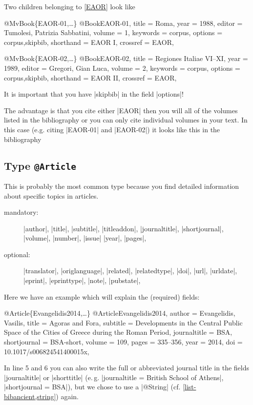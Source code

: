 \documentclass[a4paper,
10pt,
greek,
french,
spanish,
italian,
ngerman,
english
]{ltxdoc}
\begin{document}
Two children belonging to \cref{EAOR} look like

\begin{bibexample}[label=EAOR-01]{{@}MvBook\{EAOR-01,…\}}
@Book{EAOR-01,
  title     = {Roma},
  year      = {1988},
  editor    = {Tumolesi, Patrizia Sabbatini},
  volume    = {1},
  keywords  = {corpus},
  options   = {corpus,skipbib},
  shorthand = {EAOR I},
  crossref = {EAOR},
}
\end{bibexample}

\begin{bibexample}[label=EAOR-02]{{@}MvBook\{EAOR-02,…\}}
@Book{EAOR-02,
  title     = {Regiones Italiae VI--XI},
  year      = {1989},
  editor    = {Gregori, Gian Luca},
  volume    = {2},
  keywords  = {corpus},
  options   = {corpus,skipbib},
  shorthand = {EAOR II},
  crossref = {EAOR},
}
\end{bibexample}
It is important that you have |skipbib| in the field |options|!

The advantage is that you cite either |EAOR| then you will all of the volumes listed in the bibliography 
or you can only cite individual volumes in your text.
In this case (e.g. citing |EAOR-01| and |EAOR-02|) it looks like this in the bibliography 


\subsection{Type \texttt{@Article}}\label{article}
 This is probably the most common type 
because you find detailed information about specific topics in articles.

\begin{description}
\item[mandatory:] 
|author|, |title|, |subtitle|, |titleaddon|,
|journaltitle|, |shortjournal|, |volume|, |number|, |issue|
|year|, |pages|, 
\item[optional:]
|translator|, |origlanguage|,
|related|, |relatedtype|,
|doi|, |url|, |urldate|, |eprint|, |eprinttype|, |note|, |pubstate|, 
 \end{description}

Here we have an example which will explain the (required)  fields:
\begin{bibexample}[label=Evangelidis2014]{{@}Article\{Evangelidis2014,…\}}
@Article{Evangelidis2014,
  author       = {Evangelidis, Vasilis},
  title        = {Agoras {and} Fora},
  subtitle     = {Developments in the Central Public Space of the Cities of Greece during the {Roman} Period},
  journaltitle = BSA,    %
  shortjournal = BSA-short,    %
  volume       = {109},
  pages        = {335--356},
  year         = {2014},
  doi          = {10.1017/s006824541400015x},
}
\end{bibexample}
In line 5 and 6 you can also write the full or abbreviated journal title in the fields |journaltitle| or |shorttitle| (e.\,g. |journaltitle = {British School of Athens}|, |shortjournal = {BSA}|), but we chose to use a |@String| (cf. \cref{list-bibancient,string}) again.
\end{document}
